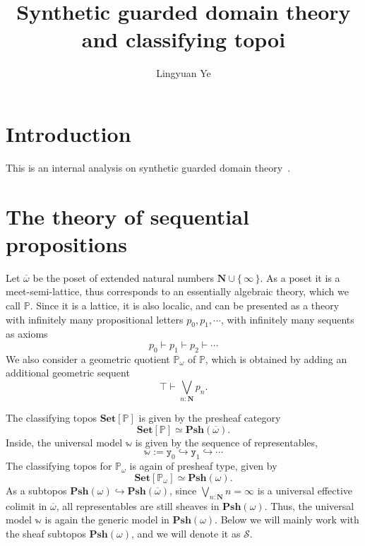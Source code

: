 \documentclass[a4paper,10pt]{amsart}
\title{Synthetic guarded domain theory and classifying topoi}
\author{Lingyuan Ye}
\theoremstyle{definition}
\newcommand{\mc}[1]{\mathcal{#1}}
\newcommand{\mb}[1]{\mathbf{#1}}
\newcommand{\mbb}[1]{\mathbb{#1}}
\newcommand{\Set}{\mb{Set}}
\newcommand{\psh}{\mb{Psh}}
\newcommand{\ov}[1]{\overline{#1}}
\newcommand{\set}[1]{\{\,#1\,\}}
\newcommand{\yon}{\mathtt{y}}
\newcommand{\hook}{\hookrightarrow}
\newcommand{\N}{\mb N}
\newcommand{\pw}{\mbb P_\omega}
\newcommand{\um}{\mbb w}
\DeclareRobustCommand{\yon}{\text{\usefont{U}{dmjhira}{m}{n}\symbol{"48}}}
\begin{document}
%

%
%

%
%

%
\maketitle              %
%

\section{Introduction}

This is an internal analysis on synthetic guarded domain theory~\cite{birkedal2012first}.

\section{The theory of sequential propositions}

Let $\ov\omega$ be the poset of extended natural numbers $\N \cup \set{\infty}$. As a poset it is a meet-semi-lattice, thus corresponds to an essentially algebraic theory, which we call $\mbb P$. Since it is a lattice, it is also localic, and can be presented as a theory with infinitely many propositional letters $p_0,p_1,\cdots$, with infinitely many sequents as axioms
\[ p_0 \vdash p_1 \vdash p_2 \vdash \cdots \]
We also consider a geometric quotient $\pw$ of $\mbb P$, which is obtained by adding an additional geometric sequent
\[ \top \vdash \bigvee_{n:\N}p_n. \]

The classifying topos $\Set[\mbb P]$ is given by the presheaf category
\[ \Set[\mbb P] \simeq \psh(\ov\omega). \]
Inside, the universal model $\um$ is given by the sequence of representables,
\[ \um := \yon_0 \hook \yon_1 \hook \cdots \]
The classifying topos for $\pw$ is again of presheaf type, given by
\[ \Set[\pw] \simeq \psh(\omega). \]
As a subtopos $\psh(\omega) \hook \psh(\ov\omega)$, since $\bigvee_{n:\N}n = \infty$ is a universal effective colimit in $\ov\omega$, all representables are still sheaves in $\psh(\omega)$. Thus, the universal model $\um$ is again the generic model in $\psh(\omega)$. Below we will mainly work with the sheaf subtopos $\psh(\omega)$, and we will denote it as $\mc S$.
\end{document}
